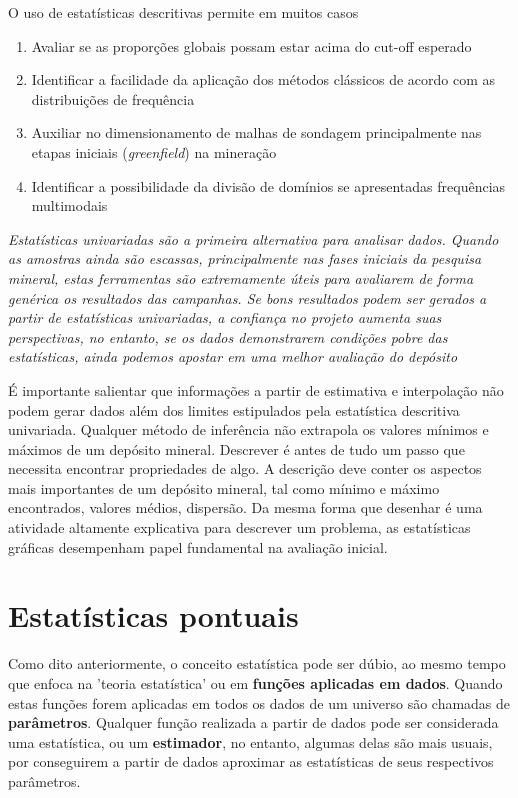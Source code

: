O uso de estatísticas descritivas permite em muitos casos 

\begin{enumerate}
	\item Avaliar se as proporções globais possam estar acima do cut-off esperado
	\item Identificar a facilidade da aplicação dos métodos clássicos de acordo com as distribuições de frequência
	\item Auxiliar no dimensionamento de malhas de sondagem principalmente nas etapas iniciais (\textit{greenfield}) na mineração
	\item Identificar a possibilidade da divisão de domínios se apresentadas frequências multimodais 
\end{enumerate}

\begin{proposition}
	\textit{Estatísticas univariadas são a primeira alternativa para analisar dados. Quando as amostras ainda são escassas, principalmente nas fases iniciais da pesquisa mineral, estas ferramentas são extremamente úteis para avaliarem de forma genérica os resultados das campanhas. Se bons resultados podem ser gerados a partir de estatísticas univariadas, a confiança no projeto aumenta suas perspectivas, no entanto, se os dados demonstrarem condições pobre das estatísticas, ainda podemos apostar em uma melhor avaliação do depósito}
\end{proposition}

É importante salientar que informações a partir de estimativa e interpolação não podem gerar dados além dos limites estipulados pela estatística descritiva univariada. Qualquer método de inferência não extrapola os valores mínimos e máximos de um depósito mineral. Descrever é antes de tudo um passo que necessita encontrar propriedades de algo. A descrição deve conter os aspectos mais importantes de um depósito mineral, tal como mínimo e máximo encontrados, valores médios, dispersão. Da mesma forma que desenhar é uma atividade altamente explicativa para descrever um problema, as estatísticas gráficas desempenham papel fundamental na avaliação inicial.



\section{Estatísticas pontuais}

Como dito anteriormente, o conceito estatística pode ser dúbio, ao mesmo tempo que enfoca na 'teoria estatística' ou em \textbf{funções aplicadas em dados}. Quando estas funções forem aplicadas em todos os dados de um universo são chamadas de \textbf{parâmetros}. Qualquer função realizada a partir de dados pode ser considerada uma estatística, ou um \textbf{estimador}, no entanto, algumas delas são mais usuais, por conseguirem a partir de dados aproximar as estatísticas de seus respectivos parâmetros.

